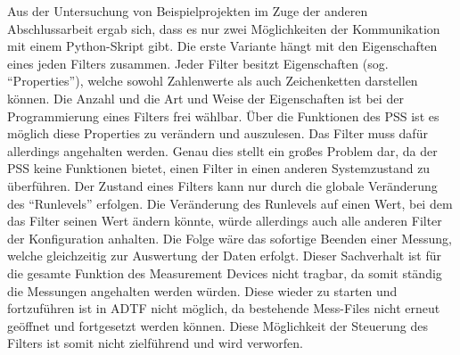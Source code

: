 \documentclass[12pt,a4paper]{report}
\begin{document}
Aus der Untersuchung von Beispielprojekten im Zuge der anderen Abschlussarbeit ergab sich, dass es nur zwei Möglichkeiten der Kommunikation mit einem Python-Skript gibt. Die erste Variante hängt mit den Eigenschaften eines jeden Filters zusammen. Jeder Filter besitzt Eigenschaften (sog. "`Properties"'), welche sowohl Zahlenwerte als auch Zeichenketten darstellen können. Die Anzahl und die Art und Weise der Eigenschaften ist bei der Programmierung eines Filters frei wählbar. Über die Funktionen des PSS ist es möglich diese Properties zu verändern und auszulesen. Das Filter muss dafür allerdings angehalten werden. Genau dies stellt ein gro\ss es Problem dar, da der PSS keine Funktionen bietet, einen Filter in einen anderen Systemzustand zu überführen. Der Zustand eines Filters kann nur durch die globale Veränderung des "`Runlevels"' erfolgen. Die Veränderung des Runlevels auf einen Wert, bei dem das Filter seinen Wert ändern könnte, würde allerdings auch alle anderen Filter der Konfiguration anhalten. Die Folge wäre das sofortige Beenden einer Messung, welche gleichzeitig zur Auswertung der Daten erfolgt. Dieser Sachverhalt ist für die gesamte Funktion des Measurement Devices nicht tragbar, da somit ständig die Messungen angehalten werden würden. Diese wieder zu starten und fortzuführen ist in ADTF nicht möglich, da bestehende Mess-Files nicht erneut geöffnet und fortgesetzt werden können. Diese Möglichkeit der Steuerung des Filters ist somit nicht zielführend und wird verworfen.
\end{document}
